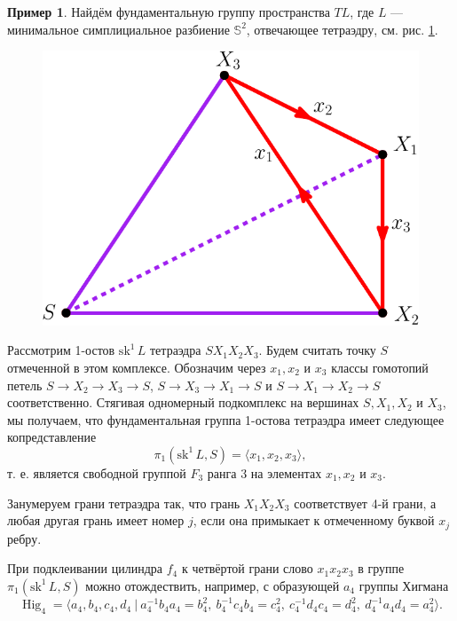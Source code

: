 \documentclass[14pt, dvipsnames, twoside]{extarticle}
\theoremstyle{definition}
\newtheorem{example}{Пример}
\theoremstyle{remark}
\DeclareMathOperator{\Hig}{\mathrm{Hig}}
\begin{document}
\begin{example}

Найдём фундаментальную группу пространства $TL$, где $L$ --- минимальное симплициальное разбиение $\mathbb{S}^2$, отвечающее тетраэдру, см. рис. \ref{pict_tetrahedron}.      
 
 \begin{figure}
 \begin{center}
\includegraphics[scale=0.8]{tetrahedron}
\caption{}\label{pict_tetrahedron}
\end{center}
\end{figure}

Рассмотрим 1-остов $\mathrm{sk}^1\, L$ тетраэдра $SX_1X_2X_3$. Будем считать точку $S$ отмеченной в этом комплексе. Обозначим через $x_1, x_2$ и $x_3$ классы гомотопий петель $S\to X_2\to X_3\to S$, $S\to X_3\to X_1\to S$ и $S\to X_1\to X_2\to S$ соответственно. Стягивая одномерный подкомплекс на вершинах $S, X_1, X_2$ и $X_3$, мы получаем, что фундаментальная группа 1-остова тетраэдра имеет следующее копредставление $$\pi_1(\mathrm{sk}^1\, L, S) = \langle x_1, x_2, x_3 \rangle,$$ т. е. является свободной группой $F_3$ ранга 3 на элементах $x_1, x_2$ и $x_3$.

Занумеруем грани тетраэдра так, что грань $X_1X_2X_3$ соответствует 4-й грани, а любая другая грань имеет номер $j$, если она примыкает к отмеченному буквой $x_j$ ребру.  

При подклеивании цилиндра $f_{4}$ к четвёртой грани слово $x_1 x_2 x_3$ в группе $\pi_1(\mathrm{sk}^1\, L, S)$ можно отождествить, например, с образующей $a_4$ группы Хигмана $$\Hig_4 = \langle a_4,b_4,c_4,d_4\ |\ a_4^{-1}b_4a_4 = b_4^2, \ b_4^{-1}c_4b_4 = c_4^2, \ c_4^{-1}d_4c_4 = d_4^2, \ d_4^{-1}a_4d_4 = a_4^2 \rangle.$$


\end{example}
\end{document}
